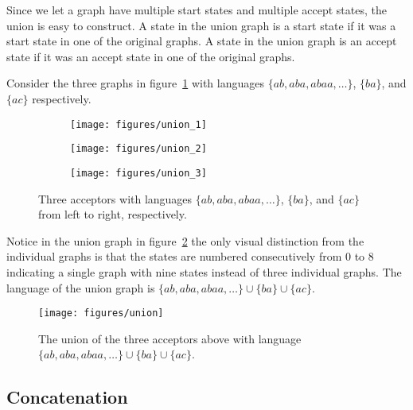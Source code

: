 Since we let a graph have multiple start states and multiple accept states, the
union is  easy to construct. A state in the union graph is a start state if it
was a start state in one of the original graphs. A state in the union graph is
an accept state if it was an accept state in one of the original graphs.

Consider the three graphs in figure~\ref{fig:union_inputs} with languages
$\{ab, aba, abaa, \ldots\}$, $\{ba\}$, and $\{ac\}$ respectively.

\begin{figure}
    \centering
    \begin{subfigure}[b]{0.8\textwidth}
        \centering
        \texttt{[image: figures/union\_1]}
        \caption{}
    \end{subfigure}
    \par\bigskip
    \begin{subfigure}[b]{0.8\textwidth}
        \centering
        \texttt{[image: figures/union\_2]}
        \caption{}
    \end{subfigure}
    \par\bigskip
    \begin{subfigure}[b]{0.8\textwidth}
        \centering
        \texttt{[image: figures/union\_3]}
        \caption{}
    \end{subfigure}
    \caption{Three acceptors with languages $\{ab, aba, abaa, \ldots\}$,
    $\{ba\}$, and $\{ac\}$ from left to right, respectively.}
    \label{fig:union_inputs}
\end{figure}

Notice in the union graph in figure~\ref{fig:union} the only visual distinction
from the individual graphs is that the states are numbered consecutively from
$0$ to $8$ indicating a single graph with nine states instead of three
individual graphs. The language of the union graph is $\{ab, aba, abaa,
\ldots\} \cup \{ba\} \cup \{ac\}$.

\begin{figure}
    \centering
    \texttt{[image: figures/union]}
    \caption{The union of the three acceptors above with language $\{ab, aba,
    abaa, \ldots\} \cup \{ba\} \cup \{ac\}$.}
    \label{fig:union}
\end{figure}

\subsection{Concatenation}

